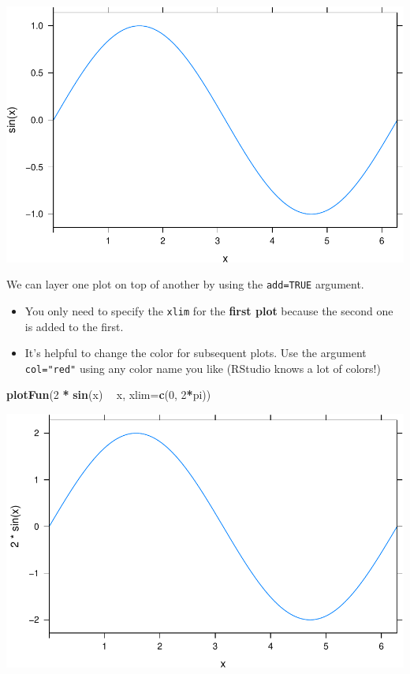 \documentclass[
]{book}
\newenvironment{Shaded}{\begin{snugshade}}{\end{snugshade}}
\newcommand{\DataTypeTok}[1]{\textcolor[rgb]{0.13,0.29,0.53}{#1}}
\newcommand{\DecValTok}[1]{\textcolor[rgb]{0.00,0.00,0.81}{#1}}
\newcommand{\KeywordTok}[1]{\textcolor[rgb]{0.13,0.29,0.53}{\textbf{#1}}}
\newcommand{\NormalTok}[1]{#1}
\newcommand{\OperatorTok}[1]{\textcolor[rgb]{0.81,0.36,0.00}{\textbf{#1}}}
\newcommand{\StringTok}[1]{\textcolor[rgb]{0.31,0.60,0.02}{#1}}
\providecommand{\tightlist}{%
  \setlength{\itemsep}{0pt}\setlength{\parskip}{0pt}}
\begin{document}
\includegraphics{_bookdown_files/math135_handbook_files/figure-latex/unnamed-chunk-30-2.pdf}

We can layer one plot on top of another by using the \texttt{add=TRUE} argument.

\begin{itemize}
\tightlist
\item
  You only need to specify the \texttt{xlim} for the \textbf{first plot} because the second one is added to the first.
\item
  It's helpful to change the color for subsequent plots. Use the argument \texttt{col="red"} using any color name you like (RStudio knows a lot of colors!)
\end{itemize}

\begin{Shaded}
\begin{Highlighting}[]
\KeywordTok{plotFun}\NormalTok{(}\DecValTok{2} \OperatorTok{*}\StringTok{ }\KeywordTok{sin}\NormalTok{(x) }\OperatorTok{~}\StringTok{ }\NormalTok{x, }\DataTypeTok{xlim=}\KeywordTok{c}\NormalTok{(}\DecValTok{0}\NormalTok{, }\DecValTok{2}\OperatorTok{*}\NormalTok{pi))}
\end{Highlighting}
\end{Shaded}

\includegraphics{_bookdown_files/math135_handbook_files/figure-latex/unnamed-chunk-31-1.pdf}
\end{document}
